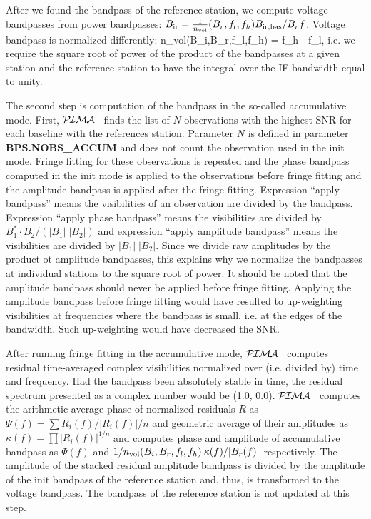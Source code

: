 \documentclass[11pt]{article}
\newcommand{\Blb}[1]{\textcolor{Dblue}{\bf #1}}
\newcommand{\PIMA}{\textcolor{Dgreen}{$\cal P\hspace{-0.067em}I\hspace{-0.067em}M\hspace{-0.067em}A$} }
\begin{document}
  After we found the bandpass of the reference station, we compute 
voltage bandpasses from power bandpasses: 
$B_{\rm ir} = \frac{1}{n_{\rm vol}} (B_r,f_l,f_h)
                                     B_{\rm ir,bas}/B_r{f}$.
Voltage bandpass is normalized differently: 
%
\beq
   n_{\rm vol}(B_i,B_r,f_l,f_h) = 
             {f_h - f_l},
%
i.e. we require the square root of power of the product of the 
bandpasses at a given station and the reference station to have 
the integral over the IF bandwidth equal to unity.
  
  The second step is computation of the bandpass in the so-called 
{\sc accumulative} mode. First, \PIMA\ finds the list of $N$ observations
with the highest SNR for each baseline with the references station.
Parameter $N$ is defined in parameter \Blb{BPS.NOBS\_ACCUM} and does
not count the observation used in the {\sc init} mode. Fringe fitting 
for these observations is repeated and the phase bandpass computed
in the {\sc init} mode is applied to the observations before fringe 
fitting and the amplitude bandpass is applied after the fringe fitting. 
Expression ``apply bandpass'' means the visibilities of an observation 
are divided by the bandpass. Expression ``apply phase bandpass'' means 
the visibilities are divided by $B^{*}_1 \cdot B_2/(|B_1| \; |B_2|)$ 
and expression ``apply amplitude bandpass'' means the visibilities are 
divided by $|B_1| \; |B_2|$. Since we divide raw amplitudes by the 
product ot amplitude bandpasses, this explains why we normalize the
bandpasses at individual stations to the square root of power.
It should be noted that the amplitude bandpass should never be applied 
before fringe fitting. Applying the amplitude bandpass before fringe 
fitting would have resulted to up-weighting visibilities at frequencies 
where the bandpass is small, i.e. at the edges of the bandwidth. Such 
up-weighting would have decreased the SNR.

  After running fringe fitting in the accumulative mode, \PIMA\ computes
residual time-averaged complex visibilities normalized over (i.e. divided 
by) time and frequency. Had the bandpass been absolutely stable in time, 
the residual spectrum presented as a complex number would be (1.0, 0.0). 
\PIMA\ computes the arithmetic average phase of normalized residuals $R$
as $\Psi(f) = \sum R_i(f)/|R_i(f)|/n$ and geometric average of their 
amplitudes as $\kappa(f) = \prod |R_i(f)|^{1/n}$ and computes phase and 
amplitude of accumulative bandpass as $\Psi(f)$ and 
$ 1/n_{\rm vol}(B_i,B_r,f_l,f_h) \: \kappa(f)/|B_r(f)|$ respectively. The
amplitude of the stacked residual amplitude bandpass is divided by the 
amplitude of the {\sc init} bandpass of the reference station and, thus,
is transformed to the voltage bandpass. The bandpass of the reference 
station is not updated at this step.
\end{document}
